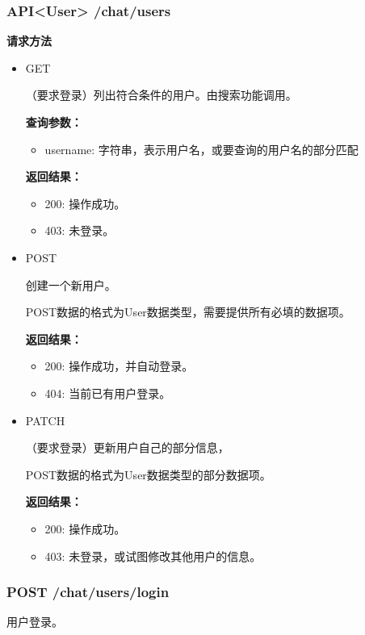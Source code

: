 \subsubsection{\textbf{API<User>} /chat/users}
\textbf{请求方法}
\begin{itemize}
    \item GET

        （要求登录）列出符合条件的用户。由搜索功能调用。

        \textbf{查询参数：}
        \begin{itemize}
            \item username: 字符串，表示用户名，或要查询的用户名的部分匹配
        \end{itemize}
        \textbf{返回结果：}
        \begin{itemize}
            \item 200: 操作成功。
            \item 403: 未登录。
        \end{itemize}
    \item POST
        
        创建一个新用户。

        POST数据的格式为User数据类型，需要提供所有必填的数据项。

        \textbf{返回结果：}
        \begin{itemize}
            \item 200: 操作成功，并自动登录。
            \item 404: 当前已有用户登录。
        \end{itemize}

    \item PATCH
        
        （要求登录）更新用户自己的部分信息，

        POST数据的格式为User数据类型的部分数据项。

        \textbf{返回结果：}
        \begin{itemize}
            \item 200: 操作成功。
            \item 403: 未登录，或试图修改其他用户的信息。
        \end{itemize}

\end{itemize}

\subsubsection{\textbf{POST} /chat/users/login}
用户登录。


